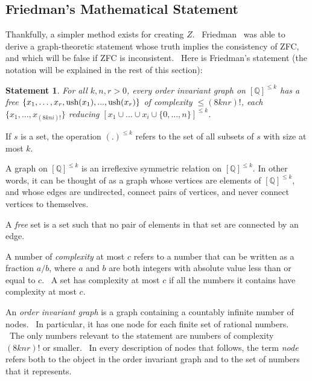 \documentclass[11pt]{article}
\newtheorem{statement}{Statement}
\begin{document}
\subsection{Friedman's Mathematical Statement} \label{sec:friedmanstate}

Thankfully, a simpler method exists for creating $Z$. \ Friedman~\cite{friedman}
was able to derive a graph-theoretic statement whose truth implies the consistency of ZFC, and which will be false if ZFC is inconsistent.\footnotemark
{} \
Here is Friedman's statement (the notation will be explained in the rest of this section):

\begin{statement} \label{eq:friedman}
For all $k, n, r > 0$, every order invariant graph on $[\mathbb{Q}]^{\le k}$ has a free $\{x_1,\dots,x_r, \\
\textrm{ush}(x_1),...,\textrm{ush}(x_r)\}$ of complexity $\le (8knr)!$, each $\{x_1, \dots, x_{(8kni)!}\}$
reducing $[x_1 \cup \dots \cup x_i \cup \{0,\dots,n\}]^{\le k}$. \cite{friedman}
\end{statement}

If $s$ is a set, the operation $(.)^{\le k}$ refers to the set of all subsets of $s$ with size at most $k$.

A graph on $[\mathbb{Q}]^{\le k}$ is an irreflexive symmetric relation on $[\mathbb{Q}]^{\le k}$. In other words, it can be thought of as a graph whose vertices are elements of $[\mathbb{Q}]^{\le k}$, and whose edges are undirected, connect pairs of vertices, and never connect vertices to themselves.

A \emph{free} set is a set such that no pair of elements in that set are connected by an edge.

A number of \emph{complexity} at most $c$ refers to a number that can be written as a fraction $a/b$, where $a$ and $b$ are both integers with absolute value less than or equal to $c$. \ A set has complexity at most $c$ if all the numbers it contains have complexity at most $c$.

An \emph{order invariant graph} is a graph containing a countably infinite number of nodes. \ In particular, it has one node for each finite set of rational numbers. \ The only numbers relevant to the statement are numbers of complexity $(8knr)!$ or smaller. \ In every description of nodes that follows, the term \emph{node} refers both to the object in the order invariant graph and to the set of numbers that it represents.
\end{document}
